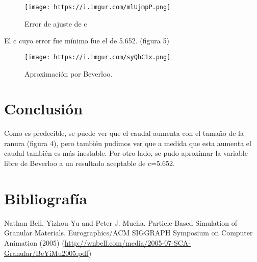 \documentclass{article}
\begin{document}
\begin{figure}[!h]
  \centerline{\texttt{[image: https://i.imgur.com/mlUjmpP.png]}}
  \caption{Error de ajuste de c}
  \label{fig:boat1}
\end{figure}

El c cuyo error fue mínimo fue el de 5.652. (figura 5)

\begin{figure}[!h]
  \centerline{\texttt{[image: https://i.imgur.com/syQhC1x.png]}}
  \caption{Aproximación por Beverloo.}
  \label{fig:boat1}
\end{figure}

\section{Conclusión}
Como es predecible, se puede ver que el caudal aumenta con el tamaño de la ranura (figura 4), pero también pudimos ver que a medida que esta aumenta el caudal también es más inestable. Por otro lado, se pudo aproximar la variable libre de Beverloo a un resultado aceptable de c=5.652.

\section {Bibliografía}
Nathan Bell, Yizhou Yu and Peter J. Mucha. Particle-Based Simulation of Granular Materials. Eurographics/ACM SIGGRAPH Symposium on Computer Animation (2005) (\url{http://wnbell.com/media/2005-07-SCA-Granular/BeYiMu2005.pdf})
\end{document}

